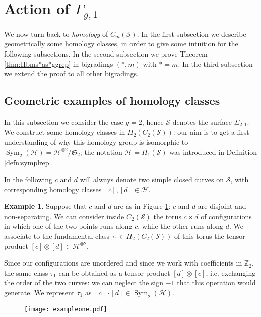 \documentclass{amsart}
\theoremstyle{plain}
\theoremstyle{definition}
\newtheorem{ex}{Example}
\renewcommand{\H}{\mathcal{H}}
\renewcommand{\S}{\mathcal{S}}
\newcommand{\Z}{\mathbb{Z}}
\renewcommand{\gg}{\Gamma_{g,1}}
\newcommand{\cms}{C_m(\S)}
\DeclareMathOperator{\Sym}{Sym}
\begin{document}
\section{Action of \texorpdfstring{$\gg$}{Gamma(g,1)}}
\label{sec:Actiongg}
We now turn back to \emph{homology} of $\cms$. In the first subsection we describe geometrically some
homology classes, in order to give some intuition for the following subsections.
In the second subsection we prove Theorem
\ref{thm:Hbms*as*ggrep} in bigradings $(*,m)$ with $*=m$.
In the third subsection we extend the proof to all other bigradings.

\subsection{Geometric examples of homology classes}

In this subsection we consider the case $g=2$, hence $\S$ denotes the surface $\Sigma_{2,1}$.
We construct some homology classes in $H_2(C_2(\S))$: our aim is to get a first understanding
of why this homology group is isomorphic to $\Sym_2(\H)=\H^{\otimes 2}/\mathfrak{S}_2$;
the notation $\H=H_1(\S)$ was introduced in Definition \ref{defn:symplrep}.

In the following $c$ and $d$ will always denote two simple closed curves on $\S$, with corresponding homology classes $[c],[d]\in\H$.
\begin{ex}
 \label{ex:one}
Suppose that $c$ and $d$ are as in Figure \ref{fig:exampleone}: $c$ and $d$ are disjoint and non-separating.
We can consider inside $C_2(\S)$
the torus $c\times d$ of configurations in which one of the two points runs along $c$, while the other runs
along $d$. We associate to the fundamental class $\tau_1\in H_2(C_2(\S))$ of this torus the tensor product $[c]\otimes[d]\in\H^{\otimes 2}$.

Since our configurations are unordered and since we work with coefficients in $\Z_2$, the same
class $\tau_1$ can be obtained as a tensor product $[d]\otimes[c]$, i.e. exchanging the order of the two
curves: we can neglect the sign $-1$ that this operation would generate. We represent $\tau_1$ as $[c]\cdot[d]\in\Sym_2(\H)$.
\end{ex}
\begin{figure}[ht]\centering
 \texttt{[image: exampleone.pdf]}
 \caption{}
\label{fig:exampleone}
\end{figure}
\end{document}
